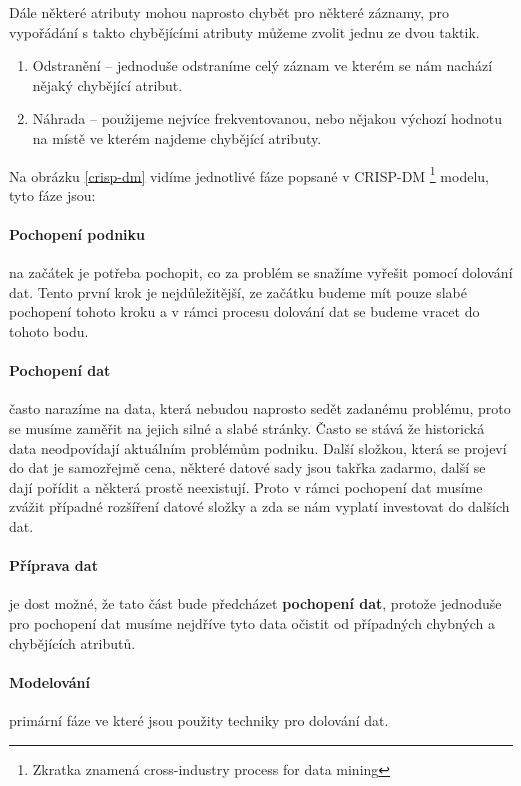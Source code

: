 \par Dále některé atributy mohou naprosto chybět pro některé záznamy, pro vypořádání s takto chybějícími atributy můžeme zvolit jednu ze dvou taktik. \cite{data-mining-principles}
\begin{enumerate}
\item Odstranění -- jednoduše odstraníme celý záznam ve kterém se nám nachází nějaký chybějící atribut.
\item Náhrada -- použijeme nejvíce frekventovanou, nebo nějakou výchozí hodnotu na místě ve kterém najdeme chybějící atributy. \cite{data-mining-principles}
\end{enumerate}

\par Na obrázku \ref{crisp-dm} vidíme jednotlivé fáze popsané v CRISP-DM \footnote{Zkratka znamená cross-industry process for data mining} modelu, tyto fáze jsou:
\paragraph{Pochopení podniku} na začátek je potřeba pochopit, co za problém se snažíme vyřešit pomocí dolování dat. Tento první krok je nejdůležitější, ze začátku budeme mít pouze slabé pochopení tohoto kroku a v rámci procesu dolování dat se budeme vracet do tohoto bodu. \cite{data-mining-practical}

\paragraph{Pochopení dat} často narazíme na data, která nebudou naprosto sedět zadanému problému, proto se musíme zaměřit na jejich silné a slabé stránky. Často se stává že historická data neodpovídají aktuálním problémům podniku. Další složkou, která se projeví do dat je samozřejmě cena, některé datové sady jsou takřka zadarmo, další se dají pořídit a některá prostě neexistují. Proto v rámci pochopení dat musíme zvážit případné rozšíření datové složky a zda se nám vyplatí investovat do dalších dat. \cite{data-mining-practical}

\paragraph{Příprava dat} je dost možné, že tato část bude předcházet \textbf{pochopení dat}, protože jednoduše pro pochopení dat musíme nejdříve tyto data očistit od případných chybných a chybějících atributů. \cite{data-mining-practical}

\paragraph{Modelování} primární fáze ve které jsou použity techniky pro dolování dat. \cite{data-mining-practical}

